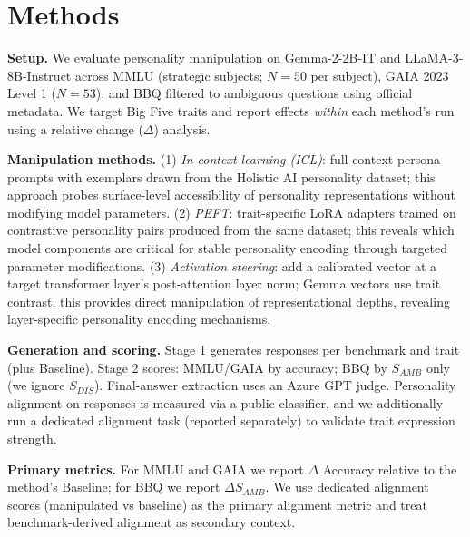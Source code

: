 \section{Methods}

\textbf{Setup.} We evaluate personality manipulation on Gemma-2-2B-IT and LLaMA-3-8B-Instruct across MMLU (strategic subjects; \(N=50\) per subject), GAIA 2023 Level 1 (\(N=53\)), and BBQ filtered to ambiguous questions using official metadata. We target Big Five traits and report effects \emph{within} each method's run using a relative change (\(\Delta\)) analysis.

\textbf{Manipulation methods.} (1) \emph{In-context learning (ICL)}: full-context persona prompts with exemplars drawn from the Holistic AI personality dataset; this approach probes surface-level accessibility of personality representations without modifying model parameters. (2) \emph{PEFT}: trait-specific LoRA adapters trained on contrastive personality pairs produced from the same dataset; this reveals which model components are critical for stable personality encoding through targeted parameter modifications. (3) \emph{Activation steering}: add a calibrated vector at a target transformer layer's post-attention layer norm; Gemma vectors use trait contrast; this provides direct manipulation of representational depths, revealing layer-specific personality encoding mechanisms.

\textbf{Generation and scoring.} Stage 1 generates responses per benchmark and trait (plus Baseline). Stage 2 scores: MMLU/GAIA by accuracy; BBQ by \(S_{AMB}\) only (we ignore \(S_{DIS}\)). Final-answer extraction uses an Azure GPT judge. Personality alignment on responses is measured via a public classifier, and we additionally run a dedicated alignment task (reported separately) to validate trait expression strength.

\textbf{Primary metrics.} For MMLU and GAIA we report \(\Delta\) Accuracy relative to the method's Baseline; for BBQ we report \(\Delta S_{AMB}\). We use dedicated alignment scores (manipulated vs baseline) as the primary alignment metric and treat benchmark-derived alignment as secondary context.
